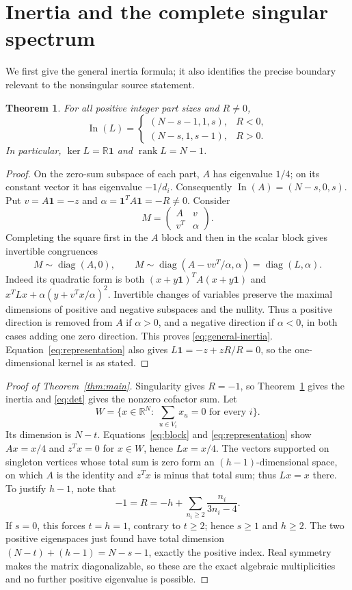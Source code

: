 \documentclass[11pt]{article}
\newtheorem{theorem}{Theorem}
\newcommand{\In}{\operatorname{In}}
\newcommand{\diag}{\operatorname{diag}}
\newcommand{\one}{\mathbf{1}}
\newcommand{\R}{\mathbb{R}}
\begin{document}
\section{Inertia and the complete singular spectrum}
We first give the general inertia formula; it also identifies the precise
boundary relevant to the nonsingular source statement.
\begin{theorem}\label{thm:general}
For all positive integer part sizes and $R\ne0$,
\begin{equation}\label{eq:general-inertia}
 \In(L)=\begin{cases}
 (N-s-1,1,s),&R<0,\\
 (N-s,1,s-1),&R>0.
 \end{cases}
\end{equation}
In particular, $\ker L=\R\one$ and $\operatorname{rank}L=N-1$.
\end{theorem}
\begin{proof}
On the zero-sum subspace of each part, $A$ has eigenvalue $1/4$;
on its constant vector it has eigenvalue $-1/d_i$.
Consequently $\In(A)=(N-s,0,s)$. Put $v=A\one=-z$ and
$\alpha=\one^TA\one=-R\ne0$. Consider
\[
 M=\begin{pmatrix}A&v\\v^T&\alpha\end{pmatrix}.
\]
Completing the square first in the $A$ block and then in the scalar block
gives invertible congruences
\[
 M\sim\diag(A,0),\qquad
 M\sim\diag(A-vv^T/\alpha,\alpha)=\diag(L,\alpha).
\]
Indeed its quadratic form is both
$(x+y\one)^TA(x+y\one)$ and
$x^TLx+\alpha(y+v^Tx/\alpha)^2$.
Invertible changes of variables preserve the maximal dimensions of positive
and negative subspaces and the nullity. Thus a positive direction is removed
from $A$ if $\alpha>0$, and a negative direction if $\alpha<0$, in both cases
adding one zero direction. This proves \eqref{eq:general-inertia}.
Equation~\eqref{eq:representation} also gives $L\one=-z+zR/R=0$,
so the one-dimensional kernel is as stated.
\end{proof}

\begin{proof}[Proof of Theorem~\ref{thm:main}]
Singularity gives $R=-1$, so Theorem~\ref{thm:general} gives the inertia
and \eqref{eq:det} gives the nonzero cofactor sum. Let
\[
 W=\{x\in\R^N:\ \sum_{u\in V_i}x_u=0\text{ for every }i\}.
\]
Its dimension is $N-t$. Equations~\eqref{eq:block} and
\eqref{eq:representation} show $Ax=x/4$ and $z^Tx=0$ for $x\in W$,
hence $Lx=x/4$. The vectors supported on singleton vertices whose total
sum is zero form an $(h-1)$-dimensional space, on which $A$ is the identity
and $z^Tx$ is minus that total sum; thus $Lx=x$ there.
To justify $h-1$, note that
\[
 -1=R=-h+\sum_{n_i\ge2}\frac{n_i}{3n_i-4}.
\]
If $s=0$, this forces $t=h=1$, contrary to $t\ge2$; hence $s\ge1$ and $h\ge2$.
The two positive eigenspaces just found have total dimension
$(N-t)+(h-1)=N-s-1$, exactly the positive index.
Real symmetry makes the matrix diagonalizable, so these are the exact
algebraic multiplicities and no further positive eigenvalue is possible.
\end{proof}
\end{document}
